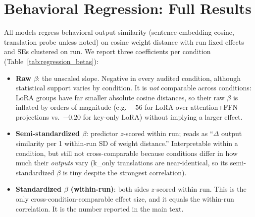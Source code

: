 \documentclass{article}
\theoremstyle{definition}
\theoremstyle{plain}
\begin{document}
\section{Behavioral Regression: Full Results}
\label{app:regression}

All models regress behavioral output similarity (sentence-embedding cosine, translation probe
unless noted) on cosine weight distance with run fixed effects and SEs clustered on run. We report
three coefficients per condition (Table~\ref{tab:regression_betas}):
\begin{itemize}
  \item \textbf{Raw $\beta$}: the unscaled slope. Negative in every audited condition, although
    statistical support varies by condition. It is
    \emph{not} comparable across conditions: LoRA groups have far smaller absolute cosine distances,
    so their raw $\beta$ is inflated by orders of magnitude (e.g.\ $-56$ for LoRA over attention+FFN
    projections vs.\ $-0.20$ for key-only LoRA) without implying a larger effect.
  \item \textbf{Semi-standardized $\beta$}: predictor $z$-scored within run; reads as ``$\Delta$
    output similarity per 1 within-run SD of weight distance.'' Interpretable within a condition,
    but still not cross-comparable because conditions differ in how much their \emph{outputs} vary
    (k\_only translations are near-identical, so its semi-standardized $\beta$ is tiny despite the
    strongest correlation).
  \item \textbf{Standardized $\beta$ (within-run)}: both sides $z$-scored within run. This is the
    only cross-condition-comparable effect size, and it equals the within-run correlation. It is the
    number reported in the main text.
\end{itemize}
\end{document}
